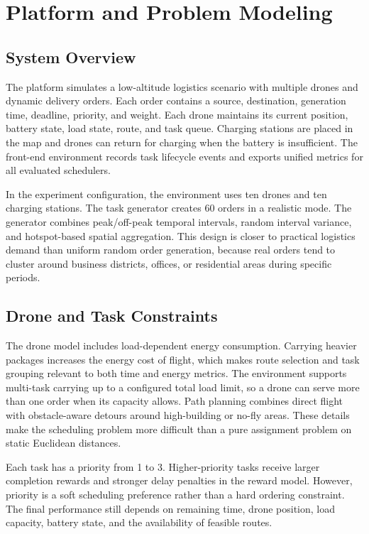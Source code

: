 \documentclass[sigconf,balance=false]{aamas}
\begin{document}
\section{Platform and Problem Modeling}

\subsection{System Overview}

The platform simulates a low-altitude logistics scenario with multiple drones and dynamic delivery orders. Each order contains a source, destination, generation time, deadline, priority, and weight. Each drone maintains its current position, battery state, load state, route, and task queue. Charging stations are placed in the map and drones can return for charging when the battery is insufficient. The front-end environment records task lifecycle events and exports unified metrics for all evaluated schedulers.

In the experiment configuration, the environment uses ten drones and ten charging stations. The task generator creates 60 orders in a realistic mode. The generator combines peak/off-peak temporal intervals, random interval variance, and hotspot-based spatial aggregation. This design is closer to practical logistics demand than uniform random order generation, because real orders tend to cluster around business districts, offices, or residential areas during specific periods.

\subsection{Drone and Task Constraints}

The drone model includes load-dependent energy consumption. Carrying heavier packages increases the energy cost of flight, which makes route selection and task grouping relevant to both time and energy metrics. The environment supports multi-task carrying up to a configured total load limit, so a drone can serve more than one order when its capacity allows. Path planning combines direct flight with obstacle-aware detours around high-building or no-fly areas. These details make the scheduling problem more difficult than a pure assignment problem on static Euclidean distances.

Each task has a priority from 1 to 3. Higher-priority tasks receive larger completion rewards and stronger delay penalties in the reward model. However, priority is a soft scheduling preference rather than a hard ordering constraint. The final performance still depends on remaining time, drone position, load capacity, battery state, and the availability of feasible routes.
\end{document}
